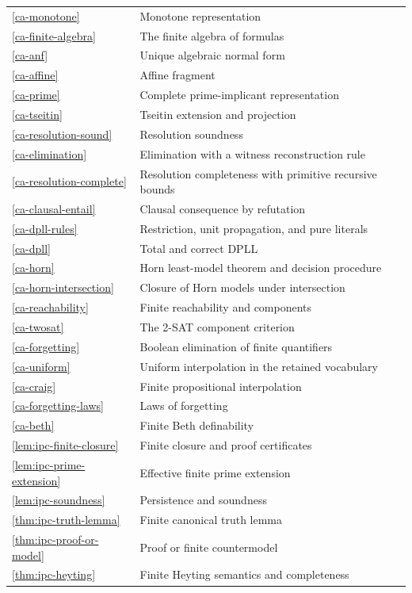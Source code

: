 \begin{longtable}{@{}p{}p{}@{}}
\ref{ca-monotone} & Monotone representation \\
\ref{ca-finite-algebra} & The finite algebra of formulas \\
\ref{ca-anf} & Unique algebraic normal form \\
\ref{ca-affine} & Affine fragment \\
\ref{ca-prime} & Complete prime-implicant representation \\
\ref{ca-tseitin} & Tseitin extension and projection \\
\ref{ca-resolution-sound} & Resolution soundness \\
\ref{ca-elimination} & Elimination with a witness reconstruction rule \\
\ref{ca-resolution-complete} & Resolution completeness with primitive recursive bounds \\
\ref{ca-clausal-entail} & Clausal consequence by refutation \\
\ref{ca-dpll-rules} & Restriction, unit propagation, and pure literals \\
\ref{ca-dpll} & Total and correct DPLL \\
\ref{ca-horn} & Horn least-model theorem and decision procedure \\
\ref{ca-horn-intersection} & Closure of Horn models under intersection \\
\ref{ca-reachability} & Finite reachability and components \\
\ref{ca-twosat} & The 2-SAT component criterion \\
\ref{ca-forgetting} & Boolean elimination of finite quantifiers \\
\ref{ca-uniform} & Uniform interpolation in the retained vocabulary \\
\ref{ca-craig} & Finite propositional interpolation \\
\ref{ca-forgetting-laws} & Laws of forgetting \\
\ref{ca-beth} & Finite Beth definability \\
\ref{lem:ipc-finite-closure} & Finite closure and proof certificates \\
\ref{lem:ipc-prime-extension} & Effective finite prime extension \\
\ref{lem:ipc-soundness} & Persistence and soundness \\
\ref{thm:ipc-truth-lemma} & Finite canonical truth lemma \\
\ref{thm:ipc-proof-or-model} & Proof or finite countermodel \\
\ref{thm:ipc-heyting} & Finite Heyting semantics and completeness \\

\end{longtable}
